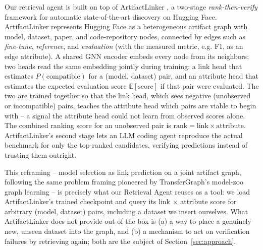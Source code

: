 
Our retrieval agent is built on top of ArtifactLinker \citep{yu2026artifactlinker}, a two-stage \emph{rank-then-verify} framework for automatic state-of-the-art discovery on Hugging Face. ArtifactLinker represents Hugging Face as a heterogeneous artifact graph with model, dataset, paper, and code-repository nodes, connected by edges such as \emph{fine-tune}, \emph{reference}, and \emph{evaluation} (with the measured metric, e.g. F1, as an edge attribute). A shared GNN encoder embeds every node from its neighbors; two heads read the same embedding jointly during training: a link head that estimates $P(\text{compatible})$ for a (model, dataset) pair, and an attribute head that estimates the expected evaluation score $\mathbb{E}[\text{score}]$ if that pair were evaluated. The two are trained together so that the link head, which sees negative (unobserved or incompatible) pairs, teaches the attribute head which pairs are viable to begin with -- a signal the attribute head could not learn from observed scores alone. The combined ranking score for an unobserved pair is $\text{rank} = \text{link} \times \text{attribute}$. ArtifactLinker's second stage lets an LLM coding agent reproduce the actual benchmark for only the top-ranked candidates, verifying predictions instead of trusting them outright.

This reframing -- model selection as link prediction on a joint artifact graph, following the same problem framing pioneered by TransferGraph's model-zoo graph learning \citep{li2024transfergraph} -- is precisely what our Retrieval Agent reuses as a tool: we load ArtifactLinker's trained checkpoint and query its link $\times$ attribute score for arbitrary (model, dataset) pairs, including a dataset we insert ourselves. What ArtifactLinker does not provide out of the box is (a) a way to place a genuinely new, unseen dataset into the graph, and (b) a mechanism to act on verification failures by retrieving again; both are the subject of Section~\ref{sec:approach}.
